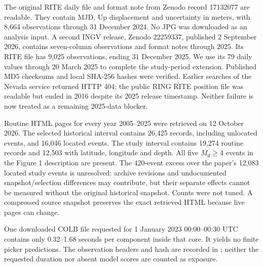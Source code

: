 The original RITE daily file and format note from Zenodo record 17132077 are readable. They contain MJD, Up displacement and uncertainty in meters, with 8,664 observations through 31 December 2024. No JPG was downloaded as an analysis input. A second INGV release, Zenodo 22259337, published 2 September 2026, contains seven-column observations and format notes through 2025. Its RITE file has 9,025 observations, ending 31 December 2025. We use its 79 daily values through 20 March 2025 to complete the study-period extension. Published MD5 checksums and local SHA-256 hashes were verified. Earlier searches of the Nevada service returned HTTP 404; the public RING RITE position file was readable but ended in 2016 despite its 2025 release timestamp. Neither failure is now treated as a remaining 2025-data blocker.

Routine HTML pages for every year 2005--2025 were retrieved on 12 October 2026. The selected historical interval contains 26,425 records, including unlocated events, and 16,046 located events. The study interval contains 19,274 routine records and 12,503 with latitude, longitude and depth. All five $M_d\geq4$ events in the Figure 1 description are present. The 420-event excess over the paper's 12,083 located study events is unresolved: archive revisions and undocumented snapshot/selection differences may contribute, but their separate effects cannot be measured without the original historical snapshot. Counts were not tuned. A compressed source snapshot preserves the exact retrieved HTML because live pages can change.

One downloaded COLB file requested for 1 January 2023 00:00--00:30 UTC contains only 0.32--1.68 seconds per component inside that core. It yields no finite picker predictions. The observation headers and hash are recorded in ; neither the requested duration nor absent model scores are counted as exposure.

